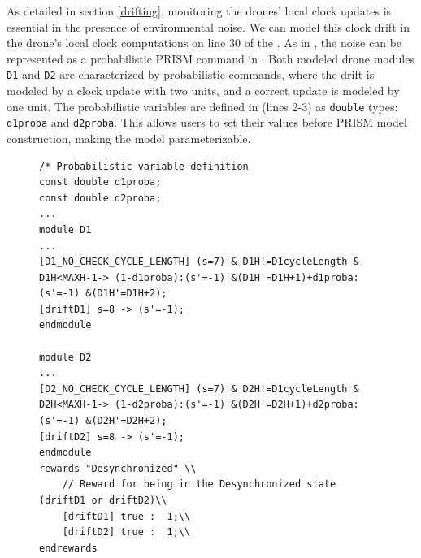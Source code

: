 As detailed in section \ref{drifting}, monitoring the drones' local clock updates is essential in the presence of environmental noise. We can model this clock drift in the drone's local clock computations on line 30 of the . As in \cite{WEBSTER2020101183}, the noise can be represented as a probabilistic PRISM command in . Both modeled drone modules \texttt{D1} and \texttt{D2}  are characterized by probabilistic commands, where the drift is modeled by a clock update with two units, and a correct update is modeled by one unit. The probabilistic variables are defined in  (lines 2-3) as \texttt{double} types: \texttt{d1proba} and \texttt{d2proba}. This allows users to set their values before PRISM model construction, making the model parameterizable.





\begin{figure}[!htb]            
\begin{minipage}{16.5cm}
\begin{lstlisting}[style=framed,%customc,
	caption=PRISM Code for Clock Drift Observation,
 	label=indriftmodel]	
/* Probabilistic variable definition  
const double d1proba;
const double d2proba;
...
module D1
...
[D1_NO_CHECK_CYCLE_LENGTH] (s=7) & D1H!=D1cycleLength & D1H<MAXH-1-> (1-d1proba):(s'=-1) &(D1H'=D1H+1)+d1proba:(s'=-1) &(D1H'=D1H+2);
[driftD1] s=8 -> (s'=-1);
endmodule

module D2
...
[D2_NO_CHECK_CYCLE_LENGTH] (s=7) & D2H!=D1cycleLength & D2H<MAXH-1-> (1-d2proba):(s'=-1) &(D2H'=D2H+1)+d2proba:(s'=-1) &(D2H'=D2H+2);
[driftD2] s=8 -> (s'=-1);
endmodule
rewards "Desynchronized" \\
	// Reward for being in the Desynchronized state (driftD1 or driftD2)\\
	[driftD1] true :  1;\\
	[driftD2] true :  1;\\
endrewards
\end{lstlisting}
 \end{minipage}  
\end{figure}


